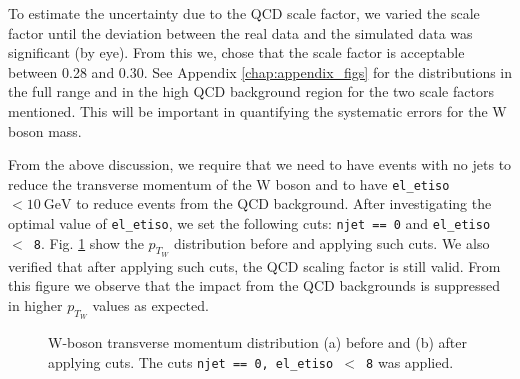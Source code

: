 \documentclass[a4paper]{report}
\numberwithin{equation}{section}
\begin{document}
To estimate the uncertainty due to the QCD scale factor, we varied the scale factor until the deviation between the real data 
and the simulated data was significant (by eye). From this we, chose that the scale factor is acceptable between 0.28 and 
0.30. See Appendix \ref{chap:appendix_figs} for the distributions in the full range 
and in the high QCD background region for the two scale factors mentioned. This will be important in quantifying the systematic 
errors for the W boson mass. \par 

From the above discussion, we require that we need to have events with no jets to reduce the transverse momentum of the W boson and 
to have \texttt{el\_etiso} $< \SI{10}{\giga\electronvolt}$ to reduce events from the QCD background. After investigating the optimal 
value of \texttt{el\_etiso}, we set the following cuts: \texttt{njet == 0} and \texttt{el\_etiso $<$ 8}. Fig. \ref{fig:ptw_cuts} show 
the $p_{T_W}$ distribution before and applying such cuts. We also verified that after applying 
such cuts, the QCD scaling factor is still valid. From this figure we observe that the impact from the QCD backgrounds 
is suppressed in higher $p_{T_W}$ values as expected. 

\begin{figure}[htb!]
	\centering
	\quad
	\centering
	\caption{W-boson transverse momentum distribution (a) before and (b) after applying cuts. The cuts \texttt{njet == 0, el\_etiso $<$ 8}
    was applied.}
	\label{fig:ptw_cuts}
\end{figure}
\end{document}
